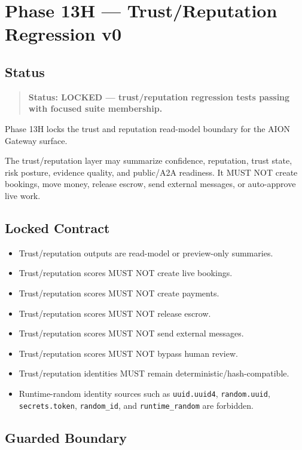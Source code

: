 \section{Phase 13H --- Trust/Reputation Regression v0}
\label{sec:aion-phase13h-trust-reputation-regression-v0}

\subsection{Status}

\begin{quote}
\textbf{Status: LOCKED --- trust/reputation regression tests passing with focused suite membership.}
\end{quote}

Phase 13H locks the trust and reputation read-model boundary for the AION
Gateway surface.

The trust/reputation layer may summarize confidence, reputation, trust state,
risk posture, evidence quality, and public/A2A readiness. It MUST NOT create
bookings, move money, release escrow, send external messages, or auto-approve
live work.

\subsection{Locked Contract}

\begin{itemize}
  \item Trust/reputation outputs are read-model or preview-only summaries.
  \item Trust/reputation scores MUST NOT create live bookings.
  \item Trust/reputation scores MUST NOT create payments.
  \item Trust/reputation scores MUST NOT release escrow.
  \item Trust/reputation scores MUST NOT send external messages.
  \item Trust/reputation scores MUST NOT bypass human review.
  \item Trust/reputation identities MUST remain deterministic/hash-compatible.
  \item Runtime-random identity sources such as \texttt{uuid.uuid4},
  \texttt{random.uuid}, \texttt{secrets.token}, \texttt{random\_id}, and
  \texttt{runtime\_random} are forbidden.
\end{itemize}

\subsection{Guarded Boundary}

